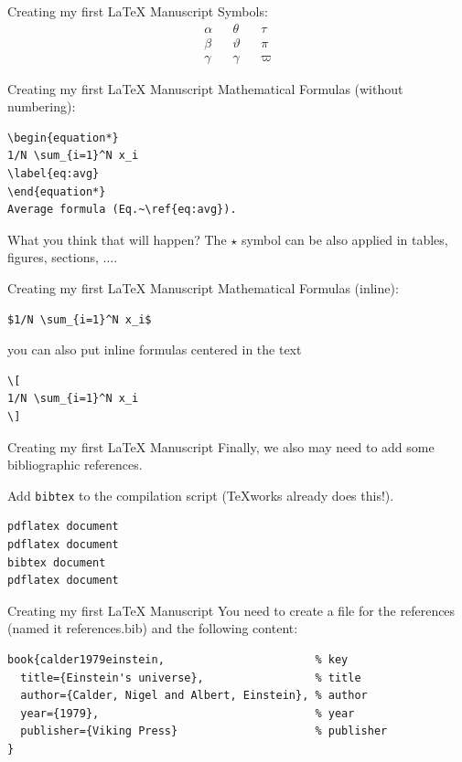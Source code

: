 \begin{frame}{Creating my first \LaTeX{} Manuscript}
Symbols:
\begin{align}
 \alpha & & \theta    &  & \tau\\
 \beta  & & \vartheta & & \pi \\   
 \gamma & & \gamma    & & \varpi
\end{align}
\end{frame}


\begin{frame}[fragile]{Creating my first \LaTeX{} Manuscript}
Mathematical Formulas (without numbering):
\scriptsize
\begin{verbatim}
\begin{equation*}
1/N \sum_{i=1}^N x_i
\label{eq:avg}
\end{equation*}
Average formula (Eq.~\ref{eq:avg}).
\end{verbatim}
\normalsize
What you think that will happen?
\pause
The $\star$ symbol can be also applied in tables, figures, sections, $\ldots$.
\end{frame}

\begin{frame}[fragile]{Creating my first \LaTeX{} Manuscript}
Mathematical Formulas (inline):
\scriptsize
\begin{verbatim}
$1/N \sum_{i=1}^N x_i$
\end{verbatim}
\normalsize
\pause
you can also put inline formulas centered in the text
\scriptsize
\begin{verbatim}
\[
1/N \sum_{i=1}^N x_i 
\]
\end{verbatim}
\end{frame}


\begin{frame}[fragile]{Creating my first \LaTeX{} Manuscript}
Finally, we also may need to add some bibliographic references.

Add \verb!bibtex! to the compilation script (TeXworks already does this!).
\scriptsize
\begin{verbatim}
pdflatex document
pdflatex document
bibtex document
pdflatex document
\end{verbatim}
\end{frame}

\begin{frame}[fragile]{Creating my first \LaTeX{} Manuscript}
You need to create a file for the references (named it references.bib) and the following content:
\scriptsize
\begin{verbatim}
book{calder1979einstein,                       % key
  title={Einstein's universe},                 % title
  author={Calder, Nigel and Albert, Einstein}, % author
  year={1979},                                 % year
  publisher={Viking Press}                     % publisher
}
\end{verbatim}
\end{frame}


